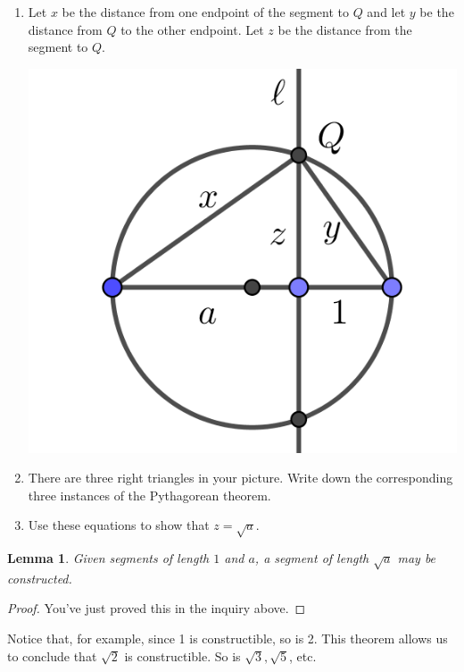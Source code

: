 \documentclass[11pt]{article}
\newenvironment{task}
	{\begin{mdframed}[linecolor=lightgray, linewidth=3pt]\raggedright}
	{\end{mdframed}}
\newtheorem{lemma}[theorem]{Lemma}
\theoremstyle{definition}
\begin{document}
\begin{task}
\begin{enumerate}
\begin{center}
  \end{center}
    \item Let $x$ be the distance from one endpoint of the segment to $Q$ and let $y$ be the distance from $Q$ to the other endpoint. Let $z$ be
      the distance from the segment to $Q$.
  \begin{center}
    \includegraphics[scale=.75]{Images/square_roots_4.png}
  \end{center}
    \item There are three right triangles in your picture. Write down the corresponding three instances of the Pythagorean theorem.
    \item Use these equations to show that $z=\sqrt{a}$.
  \end{enumerate}
\end{task}

\begin{lemma}
  Given segments of length $1$ and $a$, a segment of length $\sqrt{a}$ may be constructed.
  \label{lemma: sqrt can be constructed}
\end{lemma}
\begin{proof}
  You've just proved this in the inquiry above.
\end{proof}

Notice that, for example, since 1 is constructible, so is 2. This theorem allows us to conclude that $\sqrt{2}$ is constructible. So is
$\sqrt{3}, \sqrt{5}$, etc.
\end{document}
